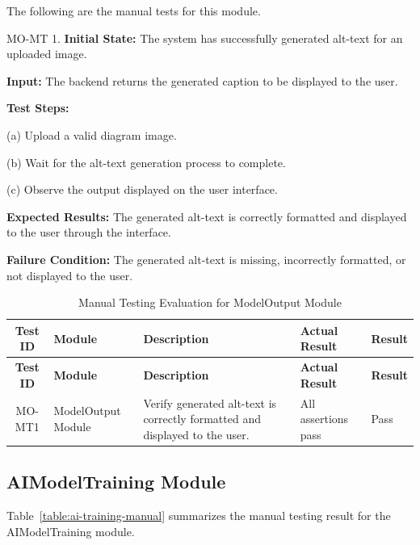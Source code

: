 \documentclass[12pt, titlepage]{article}
\begin{document}
The following are the manual tests for this module.

MO-MT 1. \textbf{Initial State:} The system has successfully
generated alt-text for an uploaded image.

\textbf{Input:} The backend returns the generated caption to be
displayed to the user.

\textbf{Test Steps:}

(a) Upload a valid diagram image.

(b) Wait for the alt-text generation process to complete.

(c) Observe the output displayed on the user interface.

\textbf{Expected Results:} The generated alt-text is correctly
formatted and displayed to the user through the interface.

\textbf{Failure Condition:} The generated alt-text is missing,
incorrectly formatted, or not displayed to the user.

\begin{longtable}{@{}c
    >{\raggedright\arraybackslash}p{4.0cm}
    >{\raggedright\arraybackslash}p{4.5cm}
    >{\raggedright\arraybackslash}p{3.6cm}
  >{\centering\arraybackslash}p{1.2cm}@{}}

  \caption{Manual Testing Evaluation for ModelOutput
  Module}\label{table:mo-manual}\\
  \toprule
  \textbf{Test ID} & \textbf{Module} & \textbf{Description} &
  \textbf{Actual Result} & \textbf{Result} \\
  \midrule
  \endfirsthead

  \toprule
  \textbf{Test ID} & \textbf{Module} & \textbf{Description} &
  \textbf{Actual Result} & \textbf{Result} \\
  \midrule
  \endhead

  \bottomrule
  \endlastfoot

  MO-MT1 & ModelOutput Module &
  Verify generated alt-text is correctly formatted and displayed to the user. &
  All assertions pass &
  \cellcolor{green}Pass \\

\end{longtable}

\subsection{AIModelTraining Module}
Table~\ref{table:ai-training-manual} summarizes the manual testing
result for the AIModelTraining module.
\end{document}
